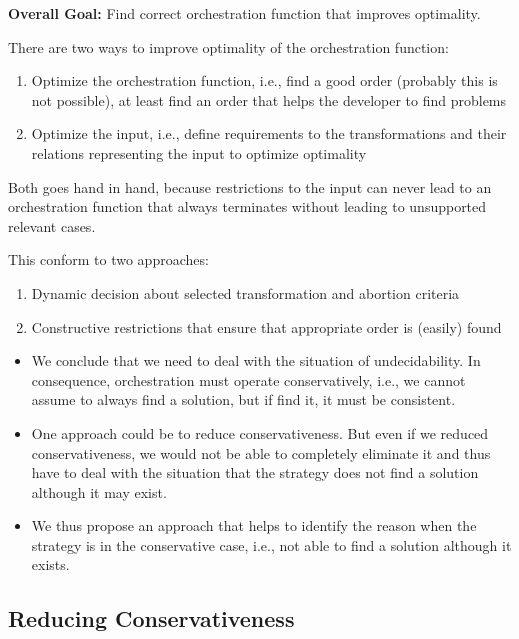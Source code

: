 \textbf{Overall Goal:} Find correct orchestration function that improves optimality.

There are two ways to improve optimality of the orchestration function:
\begin{enumerate}
    \item Optimize the orchestration function, i.e., find a good order (probably this is not possible), at least find an order that helps the developer to find problems
    \item Optimize the input, i.e., define requirements to the transformations and their relations representing the input to optimize optimality
\end{enumerate}

Both goes hand in hand, because restrictions to the input can never lead to an orchestration function that always terminates without leading to unsupported relevant cases.

This conform to two approaches:
\begin{enumerate}
    \item Dynamic decision about selected transformation and abortion criteria
    \item Constructive restrictions that ensure that appropriate order is (easily) found
\end{enumerate}


\begin{itemize}
    \item We conclude that we need to deal with the situation of undecidability. In consequence, orchestration must operate conservatively, i.e., we cannot assume to always find a solution, but if find it, it must be consistent.
    \item One approach could be to reduce conservativeness. But even if we reduced conservativeness, we would not be able to completely eliminate it and thus have to deal with the situation that the strategy does not find a solution although it may exist.
    \item We thus propose an approach that helps to identify the reason when the strategy is in the conservative case, i.e., not able to find a solution although it exists.
\end{itemize}


\subsection{Reducing Conservativeness}

